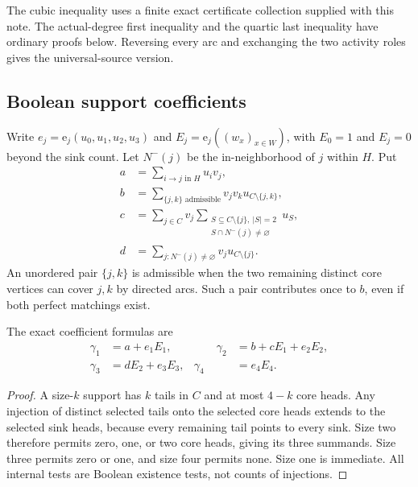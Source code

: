 \documentclass[11pt]{article}
\numberwithin{equation}{section}
\theoremstyle{definition}\newtheorem{definition}[theorem]{Definition}\newtheorem{remark}[theorem]{Remark}
\newcommand{\ee}{\mathrm e}                %
\begin{document}
The cubic inequality uses a finite exact certificate collection supplied with this note. The actual-degree first inequality and the quartic last inequality have ordinary proofs below. Reversing every arc and exchanging the two activity roles gives the universal-source version.

\subsection{Boolean support coefficients}
Write $e_j=\ee_j(u_0,u_1,u_2,u_3)$ and $E_j=\ee_j((w_x)_{x\in W})$, with $E_0=1$ and $E_j=0$ beyond the sink count. Let $N^-(j)$ be the in-neighborhood of $j$ within $H$. Put
\begin{align*}
 a&=\sum_{i\to j\text{ in }H}u_i v_j,\\
 b&=\sum_{\{j,k\}\text{ admissible}}v_jv_k u_{C\setminus\{j,k\}},\\
 c&=\sum_{j\in C}v_j
       \sum_{\substack{S\subseteq C\setminus\{j\},\ |S|=2\\
                       S\cap N^-(j)\ne\varnothing}}u_S,\\
 d&=\sum_{j:N^-(j)\ne\varnothing}v_j u_{C\setminus\{j\}}.
\end{align*}
An unordered pair $\{j,k\}$ is admissible when the two remaining distinct core vertices can cover $j,k$ by directed arcs. Such a pair contributes once to $b$, even if both perfect matchings exist.

\begin{lemma}\label{pgr:s:ad:lem:coeff}
The exact coefficient formulas are
\begin{equation}\label{pgr:s:ad:eq:coeff}
\begin{aligned}
 \gamma_1&=a+e_1E_1,&\qquad \gamma_2&=b+cE_1+e_2E_2,\\
 \gamma_3&=dE_2+e_3E_3,& \gamma_4&=e_4E_4.
\end{aligned}
\end{equation}
\end{lemma}
\begin{proof}
A size-$k$ support has $k$ tails in $C$ and at most $4-k$ core heads. Any injection of distinct selected tails onto the selected core heads extends to the selected sink heads, because every remaining tail points to every sink. Size two therefore permits zero, one, or two core heads, giving its three summands. Size three permits zero or one, and size four permits none. Size one is immediate. All internal tests are Boolean existence tests, not counts of injections.
\end{proof}
\end{document}
